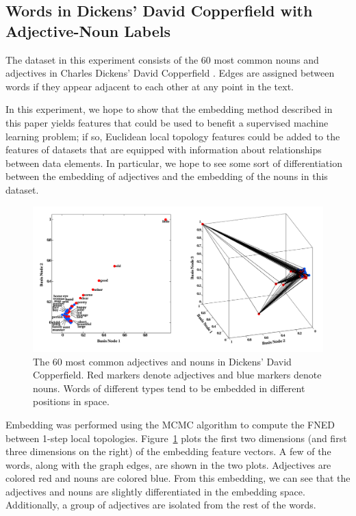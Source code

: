 \documentclass[10pt,twocolumn,fleqn]{article}
\begin{document}
\subsection{Words in Dickens' David Copperfield with Adjective-Noun Labels}

The dataset in this experiment consists of the 60 most common nouns and adjectives in Charles Dickens' David Copperfield \cite{newman2006finding}. Edges are assigned between words if they appear adjacent to each other at any point in the text.

In this experiment, we hope to show that the embedding method described in this paper yields features that could be used to benefit a supervised machine learning problem; if so, Euclidean local topology features could be added to the features of datasets that are equipped with information about relationships between data elements. In particular, we hope to see some sort of differentiation between the embedding of adjectives and the embedding of the nouns in this dataset.

\begin{figure}[!]
  \centering               
  \includegraphics[width=1\textwidth]{../img/demo6_dickensCopperfield/dickensFigure.pdf}
  \caption{The 60 most common adjectives and nouns in Dickens' David Copperfield. Red markers denote adjectives and blue markers denote nouns. Words of different types tend to be embedded in different positions in space.}
  \label{fig:dickensCopperfield}
\end{figure}

Embedding was performed using the MCMC algorithm to compute the FNED between 1-step local topologies. Figure~\ref{fig:dickensCopperfield} plots the first two dimensions (and first three dimensions on the right) of the embedding feature vectors. A few of the words, along with the graph edges, are shown in the two plots. Adjectives are colored red and nouns are colored blue. From this embedding, we can see that the adjectives and nouns are slightly differentiated in the embedding space. Additionally, a group of adjectives are isolated from the rest of the words.
\end{document}
